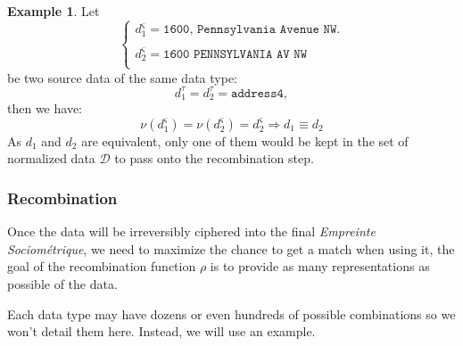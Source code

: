 \documentclass[twoside,twocolumn]{article}
\theoremstyle{definition}
\newtheorem{example}{Example}
\theoremstyle{remark}
\begin{document}
\begin{example}
    Let $$\left\{
        \begin{array}{l}
            d_1^\varsigma = \texttt{1600, Pennsylvania Avenue NW.} \\ \\
            d_2^\varsigma = \texttt{1600 PENNSYLVANIA AV NW} \\
        \end{array}
    \right.$$
    be two source data of the same data type:$$
        d_1^\tau = d_2^\tau = \texttt{address4},
    $$
    then we have:$$
        \nu(d_1^\varsigma) = \nu(d_2^\varsigma) = d_2^\varsigma \Longrightarrow d_1 \equiv d_2
    $$
    As $d_1$ and $d_2$ are equivalent, only one of them would be kept in the set of normalized data $\mathcal{D}$ to pass onto the recombination step.
\end{example}

\subsubsection{Recombination}

Once the data will be irreversibly ciphered into the final \emph{Empreinte Sociométrique}, we need to maximize the chance to get a match when using it, 
the goal of the recombination function $\rho$ is to provide as many representations as possible of the data.

Each data type may have dozens or even hundreds of possible combinations so we won't detail them here.
Instead, we will use an example.
\end{document}

